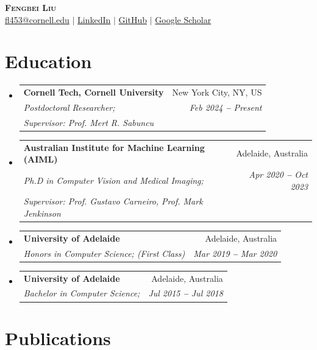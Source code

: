 \documentclass[letterpaper,11pt]{article}
\makeatletter
\newcommand{\resumeSubheading}[4]{
  \vspace{-2pt}\item
    \begin{tabular*}{0.97\textwidth}[t]{l@{\extracolsep{\fill}}r}
      \textbf{#1} & #2 \\
      \textit{\small#3} & \textit{\small #4} \\
    \end{tabular*}\vspace{-7pt}
}
\newcommand{\resumePhdheading}[5]{
  \vspace{-2pt}\item
    \begin{tabular*}{0.97\textwidth}[t]{l@{\extracolsep{\fill}}r}
      \textbf{#1} & #2 \\
      \textit{\small#3} & \textit{\small #4} \\
      \textit{\small #5} \\
    \end{tabular*}\vspace{-7pt}
}
\newcommand{\resumeSubHeadingListStart}{\begin{itemize}[leftmargin=0.15in, label={}]}
\newcommand{\resumeSubHeadingListEnd}{\end{itemize}}
\makeatother
\begin{document}

\begin{center}
    \textbf{\Huge \scshape Fengbei Liu} \\ \vspace{3pt}
    \small
    \faAt \hspace{.5pt} \href{mailto:fl453@cornell.edu}{fl453@cornell.edu}
    $|$
    \faLinkedinSquare \hspace{.5pt} \href{https://www.linkedin.com/in/fengbei-liu-2bb11b177/}{LinkedIn}
    $|$
    \faGithub \hspace{.5pt} \href{https://github.com/FBLADL?tab=repositories}{GitHub}
    $|$
    \faGlobe \hspace{.5pt} \href{https://scholar.google.com.au/citations?user=oY_qRxMAAAAJ&hl}{Google Scholar}
\end{center}




\section{Education}
  \vspace{3pt}
  \resumeSubHeadingListStart

    

    \resumePhdheading{Cornell Tech, Cornell University}{New York City, NY, US}{Postdoctoral Researcher; }{Feb 2024 \textbf{--} Present}{Supervisor: Prof. Mert R. Sabuncu}
    \resumePhdheading
      {Australian Institute for Machine Learning (AIML)
      }{Adelaide, Australia}
      {Ph.D in Computer Vision and Medical Imaging;   }{Apr 2020 \textbf{--} Oct 2023}{Supervisor: Prof. Gustavo Carneiro, Prof. Mark Jenkinson}
    \resumeSubheading{University of Adelaide}{Adelaide, Australia}{Honors in Computer Science; (First Class)}{Mar 2019 \textbf{--} Mar 2020}
    \resumeSubheading{University of Adelaide}{Adelaide, Australia}{Bachelor in Computer Science; }{Jul 2015 \textbf{--} Jul 2018}
  \resumeSubHeadingListEnd




\section{Publications}
\end{document}
